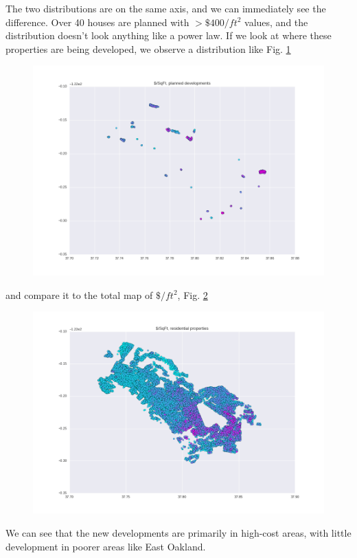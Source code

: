 \documentclass[]{report}
\begin{document}
	The two distributions are on the same axis, and we can immediately see the difference. Over 40 houses are planned with $> \$400/ft^2$ values, and the distribution doesn't look anything like a power law. If we look at where these properties are being developed, we observe a distribution like Fig. \ref{fig:planned-developments}
	\begin{figure}[H]
		\centering
		\includegraphics[width=\linewidth]{"img/planned developments"}
		\caption{}
		\label{fig:planned-developments}
	\end{figure}
	and compare it to the total map of $\$/ft^2$, Fig. \ref{fig:cost-per-square-foot-residential}
	\begin{figure}[H]
		\centering
		\includegraphics[width=\linewidth]{"img/cost per square foot, residential"}
		\caption{}
		\label{fig:cost-per-square-foot-residential}
	\end{figure}
	 We can see that the new developments are primarily in high-cost areas, with little development in poorer areas like East Oakland.
	 
\end{document}
